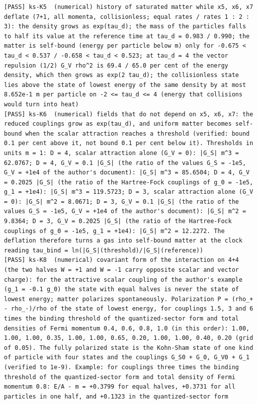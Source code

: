 \documentclass[
  10pt,
]{article}
\begin{document}
\begin{verbatim}
[PASS] ks-K5  (numerical) history of saturated matter while x5, x6, x7 deflate (7+1, all momenta, collisionless; equal rates / rates 1 : 2 : 3): the density grows as exp(tau_d); the mass of the particles falls to half its value at the reference time at tau_d = 0.983 / 0.990; the matter is self-bound (energy per particle below m) only for -0.675 < tau_d < 0.537 / -0.658 < tau_d < 0.523; at tau_d = 4 the vector repulsion (1/2) G_V rho^2 is 69.4 / 65.0 per cent of the energy density, which then grows as exp(2 tau_d); the collisionless state lies above the state of lowest energy of the same density by at most 8.652e-1 m per particle on -2 <= tau_d <= 4 (energy that collisions would turn into heat)
[PASS] ks-K6  (numerical) fields that do not depend on x5, x6, x7: the reduced couplings grow as exp(tau_d), and uniform matter becomes self-bound when the scalar attraction reaches a threshold (verified: bound 0.1 per cent above it, not bound 0.1 per cent below it). Thresholds in units m = 1: D = 4, scalar attraction alone (G_V = 0): |G_S| m^3 = 62.0767; D = 4, G_V = 0.1 |G_S| (the ratio of the values G_S = -1e5, G_V = +1e4 of the author's document): |G_S| m^3 = 85.6504; D = 4, G_V = 0.2025 |G_S| (the ratio of the Hartree-Fock couplings of g_0 = -1e5, g_1 = +1e4): |G_S| m^3 = 119.5723; D = 3, scalar attraction alone (G_V = 0): |G_S| m^2 = 8.0671; D = 3, G_V = 0.1 |G_S| (the ratio of the values G_S = -1e5, G_V = +1e4 of the author's document): |G_S| m^2 = 9.8364; D = 3, G_V = 0.2025 |G_S| (the ratio of the Hartree-Fock couplings of g_0 = -1e5, g_1 = +1e4): |G_S| m^2 = 12.2272. The deflation therefore turns a gas into self-bound matter at the clock reading tau_bind = ln(|G_S|(threshold)/|G_S|(reference))
[PASS] ks-K8  (numerical) covariant form of the interaction on 4+4 (the two halves W = +1 and W = -1 carry opposite scalar and vector charge): for the attractive scalar coupling of the author's example (g_1 = -0.1 g_0) the state with equal halves is never the state of lowest energy; matter polarizes spontaneously. Polarization P = (rho_+ - rho_-)/rho of the state of lowest energy, for couplings 1.5, 3 and 6 times the binding threshold of the quantized-sector form and total densities of Fermi momentum 0.4, 0.6, 0.8, 1.0 (in this order): 1.00, 1.00, 1.00, 0.35, 1.00, 1.00, 0.65, 0.20, 1.00, 1.00, 0.40, 0.20 (grid of 0.05). The fully polarized state is the Kohn-Sham state of one kind of particle with four states and the couplings G_S0 + G_0, G_V0 + G_1 (verified to 1e-9). Example: for couplings three times the binding threshold of the quantized-sector form and total density of Fermi momentum 0.8: E/A - m = +0.3799 for equal halves, +0.3731 for all particles in one half, and +0.1323 in the quantized-sector form

\end{verbatim}
\end{document}

